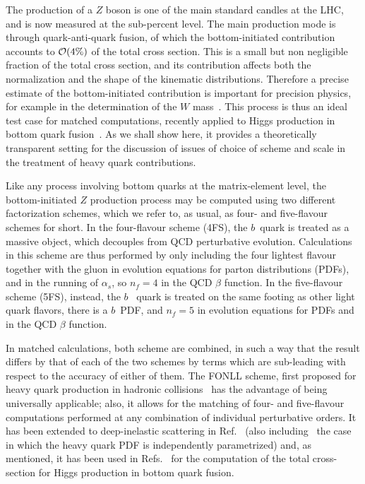 \documentclass[12pt]{article}
\begin{document}
\pagebreak


The production of a $Z$ boson is one of the main standard candles at the LHC,
and is now measured at the sub-percent level. The main production mode
is through quark-anti-quark fusion, of which the bottom-initiated contribution
accounts to ${\cal O}(4\%)$ of the total cross section.
This is  a small but non negligible fraction of the total cross
section, and
its contribution affects both the normalization and the shape
of the kinematic distributions.  Therefore a precise estimate of the
bottom-initiated contribution is important for precision physics, for
example in the determination of the $W$ mass~\cite{Bagnaschi:2018dnh}.
This process is thus an ideal test case for matched computations,
recently applied to Higgs production 
in bottom quark
fusion~\cite{Forte:2015hba,Forte:2016sja,Bonvini:2015pxa,Bonvini:2016fgf}. As
we shall show here, it  provides a theoretically transparent setting
for the discussion of issues of  choice of scheme and scale in  the
treatment of heavy quark contributions.

Like any process involving bottom quarks at the matrix-element level, 
the bottom-initiated $Z$ production process 
may be computed using two different  factorization schemes, which we
refer to, as usual, as four- and five-flavour schemes for short. In the
four-flavour scheme (4FS), the $b$~quark is treated as a massive
object, which 
decouples from QCD perturbative evolution. Calculations in this scheme
are thus performed by only including
the four lightest flavour together with the gluon  in evolution
equations for parton distributions (PDFs), and in the running of
$\alpha_s$,
so $n_f=4$ in the QCD $\beta$ function.
In the five-flavour scheme (5FS), instead, the $b$~ quark is treated on
the same footing as other light quark flavors, there is a $b$~PDF, and
$n_f=5$ in evolution equations for PDFs and in the QCD $\beta$ function.

In matched calculations, both scheme are combined, in such a way that
the result differs by that of each of the two schemes by terms which
are sub-leading with respect to the accuracy of either of them. 
The FONLL scheme,
first proposed for  heavy quark production in hadronic
collisions~\cite{Cacciari:1998it} has the advantage of being
universally applicable; also, it allows for the matching of
four- and five-flavour computations performed at any combination of
individual perturbative orders. It has been extended to deep-inelastic
scattering in Ref.~\cite{Forte:2010ta} (also
including~\cite{Ball:2015tna,Ball:2015dpa} the case in which the heavy
quark PDF is independently parametrized) and, as mentioned, it has
been
used in
Refs.~\cite{Forte:2015hba,Forte:2016sja} for the computation of the
total cross-section for Higgs production in bottom
quark fusion.
\end{document}
